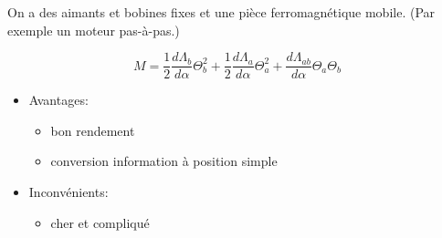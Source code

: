 \documentclass[a4paper,12pt,notitlepage]{article}
\begin{document}
    On a des aimants et bobines fixes et une pièce ferromagnétique mobile.
    (Par exemple un moteur pas-à-pas.)

    \begin{equation}
        M = \frac{1}{2}\frac{d\Lambda_{b}}{d\alpha}\Theta_b^2
            + \frac{1}{2}\frac{d\Lambda_{a}}{d\alpha}\Theta_a^2
            + \frac{d\Lambda_{ab}}{d\alpha}\Theta_a \Theta_b
        \label{moment_bobine_fixe}
    \end{equation}

    \begin{itemize}
        \item Avantages:
            \begin{itemize}
                \item bon rendement
                \item conversion information à position simple
            \end{itemize}
        \item Inconvénients:
            \begin{itemize}
                \item cher et compliqué
            \end{itemize}
    \end{itemize}
\end{document}
